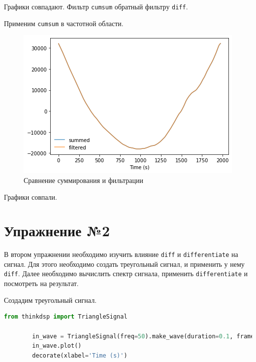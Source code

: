 \documentclass[a4paper, 14pt]{extarticle}
\begin{document}
    Графики совпадают.
    Фильтр \texttt{cumsum} обратный фильтру \texttt{diff}.

    Применим \texttt{cumsum} в частотной области.

    \begin{figure}[H]
        \centering
        \includegraphics[width=0.8\linewidth]{cumsum_filter_diff}
        \caption{Сравнение суммирования и фильтрации}
        \label{fig:cumsum_filter_diff}
    \end{figure}

    Графики совпали.

    \newpage


    \section{Упражнение №2}
    \label{sec:2}

    В втором упражнении необходимо изучить влияние \texttt{diff} и \texttt{differentiate} на сигнал.
    Для этого необходимо создать треугольный сигнал, и применить у нему \texttt{diff}.
    Далее необходимо вычислить спектр сигнала, применить \texttt{differentiate} и посмотреть на результат.

    Создадим треугольный сигнал.

    \begin{lstlisting}[language=Python, caption= Создание треугольного сигнала, label={lst:make_triangle_signal}]
        from thinkdsp import TriangleSignal

        in_wave = TriangleSignal(freq=50).make_wave(duration=0.1, framerate=44100)
        in_wave.plot()
        decorate(xlabel='Time (s)')
    \end{lstlisting}
\end{document}
